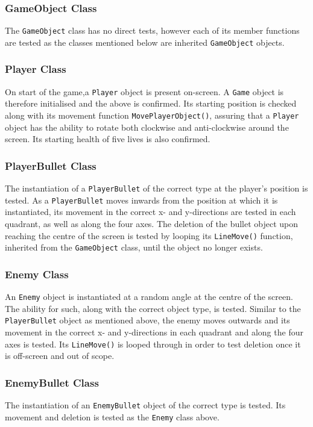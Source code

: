 \documentclass[10pt,twocolumn]{witseiepaper}
\begin{document}
\subsubsection{GameObject Class}
The \texttt{GameObject} class has no direct tests, however each of its member functions are tested as the classes mentioned below are inherited \texttt{GameObject} objects.
\subsubsection{Player Class}
On start of the game,a \texttt{Player} object is present on-screen. A \texttt{Game} object is therefore initialised and the above is confirmed. Its starting position is checked along with its movement function \texttt{MovePlayerObject()}, assuring that a \texttt{Player} object has the ability to rotate both clockwise and anti-clockwise around the screen. Its starting health of five lives is also confirmed. 
\subsubsection{PlayerBullet Class}
The instantiation of a \texttt{PlayerBullet} of the correct type at the player's position is tested. As a \texttt{PlayerBullet} moves inwards from the position at which it is instantiated, its movement in the correct x- and y-directions are tested in each quadrant, as well as along the four axes. The deletion of the bullet object upon reaching the centre of the screen is tested by looping its \texttt{LineMove()} function, inherited from the \texttt{GameObject} class, until the object no longer exists.
\subsubsection{Enemy Class}
An \texttt{Enemy} object is instantiated at a random angle at the centre of the screen. The ability for such, along with the correct object type, is tested. Similar to the \texttt{PlayerBullet} object as mentioned above, the enemy moves outwards and its movement in the correct x- and y-directions in each quadrant and along the four axes is tested. Its \texttt{LineMove()} is looped through in order to test deletion once it is off-screen and out of scope.
\subsubsection{EnemyBullet Class}
The instantiation of an \texttt{EnemyBullet} object of the correct type is tested. Its movement and deletion is tested as the \texttt{Enemy} class above.
\end{document}
